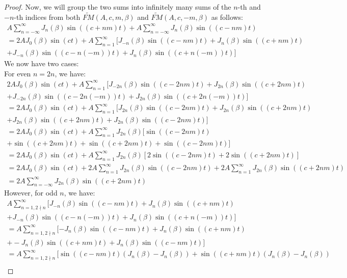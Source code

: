 \documentclass[11pt,twoside]{report}
\numberwithin{thm}{section}
\numberwithin{equation}{section}
\begin{document}
\begin{proof}
Now, we will group the two sums into infinitely many sums of the $n$-th and $-n$-th indices from both $\tilde{FM}(A, c, m, \beta)$ and $\tilde{FM}(A, c, -m, \beta)$ as follows:
\begin{align*}
    A \sum_{n=-\infty}^\infty J_n(\beta) \sin((c + nm)t) + A \sum_{n=-\infty}^\infty J_n(\beta) \sin((c - nm)t) \\
    = 2A J_0(\beta)\sin(ct) + A\sum_{n=1}^\infty [ J_{-n}(\beta)\sin((c-nm)t) + J_{n}(\beta)\sin((c+nm)t)  \\
    + J_{-n}(\beta)\sin((c-n(-m))t) + J_{n}(\beta)\sin((c+n(-m))t) ]
\end{align*}
We now have two cases:\\
For even $n = 2n$, we have:
\begin{align*}
    2A J_0(\beta)\sin(ct) + A\sum_{n=1}^\infty [ J_{-2n}(\beta)\sin((c-2nm)t) + J_{2n}(\beta)\sin((c+2nm)t)  \\
    + J_{-2n}(\beta)\sin((c-2n(-m))t) + J_{2n}(\beta)\sin((c+2n(-m))t) ]\\
    = 2A J_0(\beta)\sin(ct) + A\sum_{n=1}^\infty [ J_{2n}(\beta)\sin((c-2nm)t) + J_{2n}(\beta)\sin((c+2nm)t)  \\
    + J_{2n}(\beta)\sin((c+2nm)t) + J_{2n}(\beta)\sin((c-2nm)t) ] \\
    = 2A J_0(\beta)\sin(ct) + A\sum_{n=1}^\infty J_{2n}(\beta)[ \sin((c-2nm)t) \\
    + \sin((c+2nm)t) + \sin((c+2nm)t) + \sin((c-2nm)t) ]\\
    = 2A J_0(\beta)\sin(ct) + A\sum_{n=1}^\infty J_{2n}(\beta)[ 2\sin((c-2nm)t) + 2\sin((c+2nm)t) ]\\
    = 2A J_0(\beta)\sin(ct) + 2A\sum_{n=1}^\infty J_{2n}(\beta)\sin((c-2nm)t) + 2A\sum_{n=1}^\infty J_{2n}(\beta)\sin((c+2nm)t)\\
    = 2A \sum_{n=-\infty}^\infty J_{2n}(\beta)\sin((c + 2nm)t)
\end{align*}
However, for odd $n$, we have:
\begin{align*}
    A\sum_{n=1, 2\nmid n}^\infty [ J_{-n}(\beta)\sin((c-nm)t) + J_{n}(\beta)\sin((c+nm)t)  \\
    + J_{-n}(\beta)\sin((c-n(-m))t) + J_{n}(\beta)\sin((c+n(-m))t) ]\\
    = A\sum_{n=1, 2\nmid n}^\infty [ -J_{n}(\beta)\sin((c-nm)t) + J_{n}(\beta)\sin((c+nm)t)  \\
    + -J_{n}(\beta)\sin((c+nm)t) + J_{n}(\beta)\sin((c-nm)t) ] \\
    = A\sum_{n=1, 2\nmid n}^\infty [ \sin((c-nm)t)(J_{n}(\beta)-J_{n}(\beta)) + \sin((c+nm)t)(J_{n}(\beta) - J_{n}(\beta) ) \\

\end{align*}
\end{proof}
\end{document}
